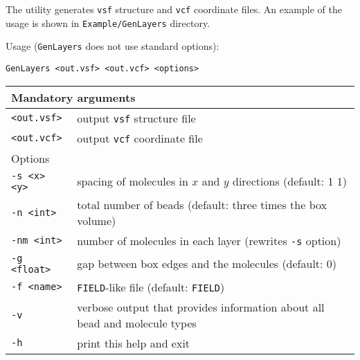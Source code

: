 The utility generates \texttt{vsf} structure and \texttt{vcf} coordinate
files. An example of the usage is shown in \texttt{Example/GenLayers}
directory.

Usage (\texttt{GenLayers} does not use standard options):

\vspace{1em}
\noindent
\texttt{GenLayers <out.vsf> <out.vcf> <options>}

\noindent
\begin{longtable}{p{}p{}}
  \toprule
  \multicolumn{2}{l}{Mandatory arguments} \\
  \midrule
  \texttt{<out.vsf>} & output \texttt{vsf} structure file \\
  \texttt{<out.vcf>} & output \texttt{vcf} coordinate file \\
  \toprule
  \multicolumn{2}{l}{Options} \\
  \midrule
  \texttt{-s <x> <y>} & spacing of molecules in $x$ and $y$ directions
    (default: 1 1) \\
  \texttt{-n <int>} & total number of beads (default: three times the box
    volume)\\
  \texttt{-nm <int>} & number of molecules in each layer (rewrites
    \texttt{-s} option) \\
  \texttt{-g <float>} & gap between box edges and the molecules (default: 0)\\
  \texttt{-f <name>} & \texttt{FIELD}-like file (default: \texttt{FIELD}) \\
  \texttt{-v}        & verbose output that provides information about all
    bead and molecule types \\
  \texttt{-h}        & print this help and exit \\
  \bottomrule
\end{longtable}
